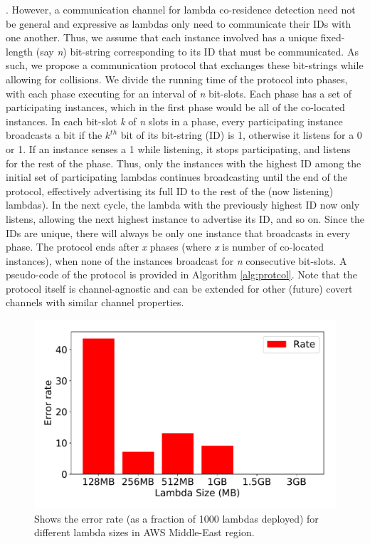 .
However, a communication channel for lambda co-residence detection need not be
general and expressive as lambdas only need to communicate their IDs with one 
another. Thus, we assume that each instance
involved has a unique fixed-length (say \emph{n}) bit-string corresponding to
its ID that must be communicated.  As such, we propose a communication protocol
that exchanges these bit-strings while allowing for collisions. We divide the
running time of the protocol into phases, with each phase executing for an
interval of \textit{n} bit-slots. Each phase has a set of participating
instances, which in the first phase would be all of the co-located instances. In
each bit-slot \textit{k} of \textit{n} slots in a phase, every participating
instance broadcasts a bit if the $k^{th}$ bit of its bit-string (ID) is 1,
otherwise it listens for a 0 or 1. If an instance senses a 1 while listening, it
stops participating, and listens for the rest of the phase. Thus, only the
instances with the highest ID among the initial set of participating lambdas
continues broadcasting until the end of the protocol, effectively advertising
its full ID to the rest of the (now listening) lambdas). In the next cycle, the
lambda with the previously highest ID now only listens, allowing the next
highest instance to advertise its ID, and so on.  Since the IDs are unique,
there will always be only one instance that broadcasts in every phase. The
protocol ends after \textit{x} phases (where \textit{x} is number of co-located
instances), when none of the instances broadcast for \textit{n} consecutive
bit-slots.  A pseudo-code of the protocol is provided in Algorithm
\ref{alg:protcol}. Note that the protocol itself is channel-agnostic and can be
extended for other (future) covert channels with similar channel properties.

\begin{figure}[!t]
  \includegraphics[width=.99\linewidth]{fig/errorrates.pdf}
  \caption{Shows the error rate (as a fraction of 1000 lambdas deployed) for different lambda sizes in AWS Middle-East region. 
\label{fig:errorrates}}
\end{figure}

